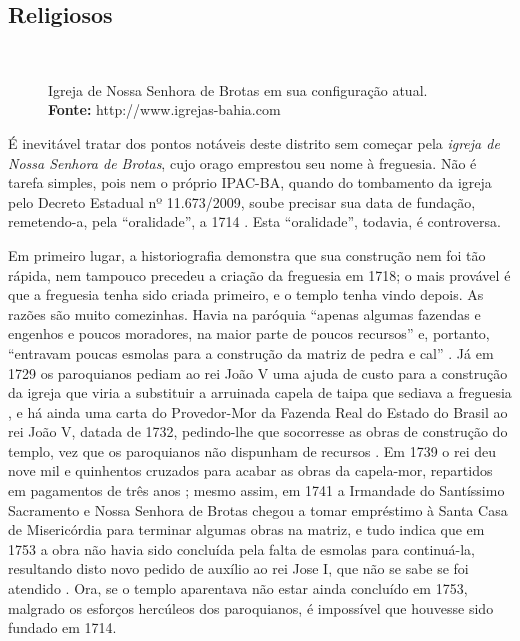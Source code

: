 \subsection{Religiosos}\label{subsec:pontrel}

\begin{figure}[!htp]
\centering
{}
\  %
\  %
\caption{Igreja de Nossa Senhora de Brotas em sua configuração atual. \textbf{Fonte:} http://www.igrejas-bahia.com}
\end{figure}

É inevitável tratar dos pontos notáveis deste distrito sem começar pela \textit{igreja de Nossa Senhora de Brotas}, cujo orago emprestou seu nome à freguesia. Não é tarefa simples, pois nem o próprio IPAC-BA, quando do tombamento da igreja pelo Decreto Estadual nº 11.673/2009, soube precisar sua data de fundação, remetendo-a, pela ``oralidade'', a 1714 \cite{ipac_brotas_2015}. Esta ``oralidade'', todavia, é controversa. 

Em primeiro lugar, a historiografia demonstra que sua construção nem foi tão rápida, nem tampouco precedeu a criação da freguesia em 1718; o mais provável é que a freguesia tenha sido criada primeiro, e o templo tenha vindo depois. As razões são muito comezinhas. Havia na paróquia ``apenas algumas fazendas e engenhos e poucos moradores, na maior parte de poucos recursos'' e, portanto, ``entravam poucas esmolas para a construção da matriz de pedra e cal'' \cite[p.~10]{ott_engenhos_1996}. Já em 1729 os paroquianos pediam ao rei João V uma ajuda de custo para a construção da igreja que viria a substituir a arruinada capela de taipa que sediava a freguesia \cite[p.~10]{ott_engenhos_1996}, e há ainda uma carta do Provedor-Mor da Fazenda Real do Estado do Brasil ao rei João V, datada de 1732, pedindo-lhe que socorresse as obras de construção do templo, vez que os paroquianos não dispunham de recursos \cite[p.~30]{vivas_botelho_2011}. Em 1739 o rei deu nove mil e quinhentos cruzados para acabar as obras da capela-mor, repartidos em pagamentos de três anos \cite[p.~10]{ott_engenhos_1996}; mesmo assim, em 1741 a Irmandade do Santíssimo Sacramento e Nossa Senhora de Brotas chegou a tomar empréstimo à Santa Casa de Misericórdia para terminar algumas obras na matriz, e tudo indica que em 1753 a obra não havia sido concluída pela falta de esmolas para continuá-la, resultando disto novo pedido de auxílio ao rei Jose I, que não se sabe se foi atendido \cite[p.~10]{ott_engenhos_1996}. Ora, se o templo aparentava não estar ainda concluído em 1753, malgrado os esforços hercúleos dos paroquianos, é impossível que houvesse sido fundado em 1714. 

